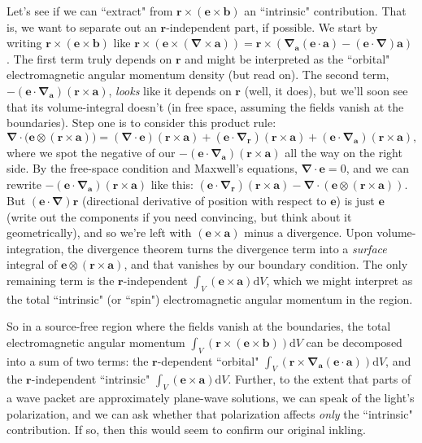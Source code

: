 \documentclass[12pt]{article}
\renewcommand{\vv}[1]{\mathbf{#1}}
\newcommand{\dd}[1]{\mathrm{d}#1}
\newcommand{\del}{\boldsymbol{\nabla}}
\begin{document}
Let's see if we can ``extract" from $\vv r \times (\vv e \times \vv b)$ an ``intrinsic" contribution. That is, we want to separate out an $\vv r$-independent part, if possible. We start by writing $\vv r \times (\vv e \times \vv b)$ like $\vv r \times (\vv e \times (\del \times \vv a)) = \vv r \times (\del_{\vv a} (\vv e \cdot \vv a) - (\vv e \cdot \del) \vv a)$. The first term truly depends on $\vv r$ and might be interpreted as the ``orbital" electromagnetic angular momentum density (but read on). The second term, $- ( \vv e \cdot \del_{\vv a} ) ( \vv r \times \vv a )$, \emph{looks} like it depends on $\vv r$ (well, it does), but we'll soon see that its volume-integral doesn't (in free space, assuming the fields vanish at the boundaries). Step one is to consider this product rule:
\begin{equation*}
\del \cdot \bigl( \vv e \otimes \left( \vv r \times \vv a \right)  \bigr) = \left( \del \cdot \vv e \right) \left( \vv r \times \vv a \right) + \left( \vv e \cdot \del_{\vv r} \right) \left( \vv r \times \vv a \right) +  \left( \vv e \cdot \del_{\vv a} \right) \left( \vv r \times \vv a \right) ,
\end{equation*}
where we spot the negative of our $- ( \vv e \cdot \del_{\vv a} ) ( \vv r \times \vv a )$ all the way on the right side. By the free-space condition and Maxwell's equations, $\del \cdot \vv e = 0$, and we can rewrite $- ( \vv e \cdot \del_{\vv a} ) ( \vv r \times \vv a )$ like this: $ ( \vv e \cdot \del_{\vv r} ) ( \vv r \times \vv a ) - \del \cdot ( \vv e \otimes ( \vv r \times \vv a ) )$. But $(\vv e \cdot \del)\vv r$ (directional derivative of position with respect to $\vv e$) is just $\vv e$ (write out the components if you need convincing, but think about it geometrically), and so we're left with $(\vv e \times \vv a)$ minus a divergence. Upon volume-integration, the divergence theorem turns the divergence term into a \emph{surface} integral of $\vv e \otimes ( \vv r \times \vv a )$, and that vanishes by our boundary condition. The only remaining term is the $\vv r$-independent $\int_V (\vv e \times \vv a) \dd V$, which we might interpret as the total ``intrinsic" (or ``spin") electromagnetic angular momentum in the region.

So in a source-free region where the fields vanish at the boundaries, the total electromagnetic angular momentum $\int_V (\vv r \times (\vv e \times \vv b)) \dd V$ can be decomposed into a sum of two terms: the $\vv r$-dependent ``orbital" $\int_V ( \vv r \times \del_{\vv a} (\vv e \cdot \vv a) ) \dd V$, and the $\vv r$-independent ``intrinsic" $\int_V (\vv e \times \vv a) \dd V$. Further, to the extent that parts of a wave packet are approximately plane-wave solutions, we can speak of the light's polarization, and we can ask whether that polarization affects \emph{only} the ``intrinsic" contribution. If so, then this would seem to confirm our original inkling.
\end{document}
